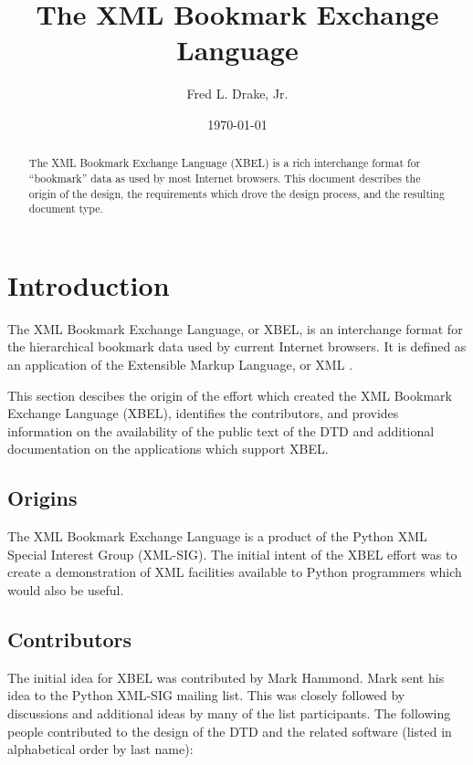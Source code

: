 \documentclass{howto}
\title{The XML Bookmark Exchange Language}
\author{Fred L. Drake, Jr.}
\date{\today}			%
\begin{document}
\maketitle

\begin{abstract}
\noindent
The XML Bookmark Exchange Language (XBEL) is a rich interchange
format for ``bookmark'' data as used by most Internet browsers.  This
document describes the origin of the design, the requirements which
drove the design process, and the resulting document type.
\end{abstract}

\tableofcontents


\section{Introduction
         \label{intro}}

  The XML Bookmark Exchange Language, or XBEL, is an interchange
  format for the hierarchical bookmark data used by current Internet
  browsers.  It is defined as an application of the Extensible Markup
  Language, or XML \cite{w3c-xml}.

  This section descibes the origin of the effort which created the XML
  Bookmark Exchange Language (XBEL), identifies the contributors, and
  provides information on the availability of the public text of the
  DTD and additional documentation on the applications which support
  XBEL.

  \subsection{Origins
              \label{origins}}

    The XML Bookmark Exchange Language is a product of the Python XML
    Special Interest Group (XML-SIG).  The initial intent of the XBEL
    effort was to create a demonstration of XML facilities available
    to Python programmers which would also be useful.

  \subsection{Contributors
              \label{contrib}}

    The initial idea for XBEL was contributed by Mark Hammond.  Mark
    sent his idea to the Python XML-SIG mailing list.  This was closely
    followed by discussions and additional ideas by many of the list
    participants.  The following people contributed to the design of
    the DTD and the related software (listed in alphabetical order by
    last name):
\end{document}
